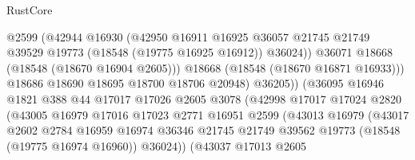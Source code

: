 \begin{lexlean}{RustCore}
\begin{coremodule}
                                    @2599
                                    (@42944
                                      @16930
                                      (@42950
                                        @16911
                                        @16925
                                        @36057
                                        @21745
                                        @21749
                                        @39529
                                        @19773
                                        (@18548 (@19775 @16925 @16912))
                                        @36024))
                                    @36071
                                    @18668
                                    (@18548 (@18670 @16904 @2605)))
                                  @18668
                                  (@18548 (@18670 @16871 @16933)))
                                @18686
                                @18690
                                @18695
                                @18700
                                @18706
                                @20948)
                              @36205))
                          (@36095
                            @16946
                            @1821
                            @388
                            @44
                            @17017
                            @17026
                            @2605
                            @3078
                            (@42998
                              @17017
                              @17024
                              @2820
                              (@43005
                                @16979
                                @17016
                                @17023
                                @2771
                                @16951
                                @2599
                                (@43013
                                  @16979
                                  (@43017
                                    @2602
                                    @2784
                                    @16959
                                    @16974
                                    @36346
                                    @21745
                                    @21749
                                    @39562
                                    @19773
                                    (@18548 (@19775 @16974 @16960))
                                    @36024))
                                (@43037
                                  @17013
                                  @2605

\end{coremodule}
\end{lexlean}
